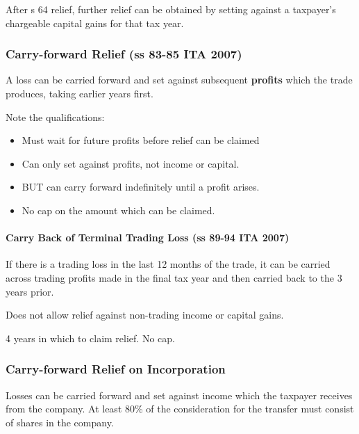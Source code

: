 \documentclass[
]{article}
\providecommand{\tightlist}{%
  \setlength{\itemsep}{0pt}\setlength{\parskip}{0pt}}
\begin{document}
After s 64 relief, further relief can be obtained by setting against a
taxpayer's chargeable capital gains for that tax year.

\hypertarget{carry-forward-relief-ss-83-85-ita-2007}{%
\subsubsection{Carry-forward Relief (ss 83-85 ITA
2007)}\label{carry-forward-relief-ss-83-85-ita-2007}}

A loss can be carried forward and set against subsequent
\textbf{profits} which the trade produces, taking earlier years first.

Note the qualifications:

\begin{itemize}
\tightlist
\item
  Must wait for future profits before relief can be claimed
\item
  Can only set against profits, not income or capital.
\item
  BUT can carry forward indefinitely until a profit arises.
\item
  No cap on the amount which can be claimed.
\end{itemize}

\hypertarget{carry-back-of-terminal-trading-loss-ss-89-94-ita-2007}{%
\paragraph{Carry Back of Terminal Trading Loss (ss 89-94 ITA
2007)}\label{carry-back-of-terminal-trading-loss-ss-89-94-ita-2007}}

If there is a trading loss in the last 12 months of the trade, it can be
carried across trading profits made in the final tax year and then
carried back to the 3 years prior.

Does not allow relief against non-trading income or capital gains.

4 years in which to claim relief. No cap.

\hypertarget{carry-forward-relief-on-incorporation}{%
\subsubsection{Carry-forward Relief on
Incorporation}\label{carry-forward-relief-on-incorporation}}

Losses can be carried forward and set against income which the taxpayer
receives from the company. At least 80\% of the consideration for the
transfer must consist of shares in the company.
\end{document}
